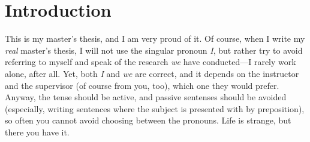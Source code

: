 \documentclass[12pt,a4paper,oneside,pdftex]{report}
\begin{document}
\cleardoublepage
\tableofcontents



\label{pages-prelude}
\cleardoublepage

\startfirstchapter

\pagestyle{headings}


% 

\chapter{Introduction}
\label{chapter:intro}

This is my master's thesis, and I am very proud of it. Of course,
when I write my \emph{real} master's thesis, I will not use the
singular pronoun \emph{I}, but rather try to avoid referring to myself
and speak of the research \emph{we} have conducted---I rarely work
alone, after all. Yet, both \emph{I} and \emph{we} are correct, and
it depends on the instructor and the supervisor (of course from you,
too), which one they would prefer. Anyway, the tense should be active,
and passive sentenses should be avoided (especially, writing sentences
where the subject is presented with by preposition), so often you
cannot avoid choosing between the pronouns. Life is strange, but there
you have it.
\end{document}
